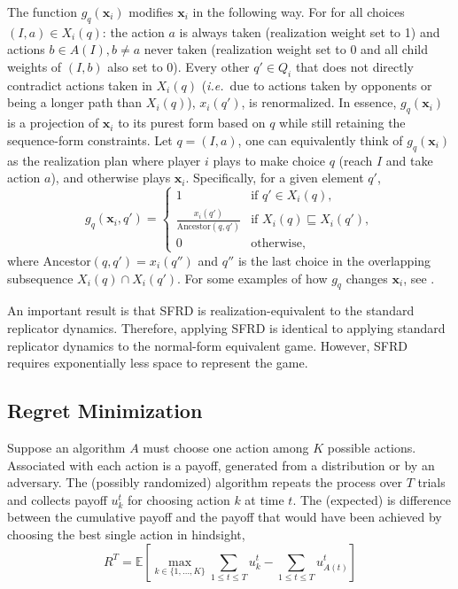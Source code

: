 \documentclass{aamas2014}
\newcommand{\bE}{\mathbb{E}}
\newcommand{\bx}{\mathbf{x}}
\newcommand{\defword}[1]{\textbf{\boldmath{#1}}}
\newcommand{\ie}{{\it i.e.}~}
\begin{document}
The function $g_q(\bx_i)$ modifies $\bx_i$ in the following way. 
For for all choices $(I,a) \in X_i(q)$: the action $a$ is always taken (realization weight
set to 1) and actions $b \in A(I), b \not= a$ never taken (realization weight set to 0 and all child weights of $(I,b)$ also set to 0). 
Every other $q' \in Q_i$ that does not directly contradict actions taken in $X_i(q)$ 
(\ie due to actions taken by opponents or being a longer path than $X_i(q)$),
$x_i(q')$, is renormalized. 
In essence, $g_q(\bx_i)$ is a projection of $\bx_i$ to its purest form based on $q$ 
while still retaining the sequence-form constraints. 
Let $q = (I,a)$, one can equivalently think of $g_q(\bx_i)$ as the realization plan where player $i$ plays to make choice $q$ 
(reach $I$ and take action $a$), and otherwise plays $\bx_i$. 
Specifically, for a given element $q'$, 
\begin{equation}
\label{eq:gdef}
g_q(\bx_i, q') = \left\{ \begin{array}{ll}
  1                                                   & \mbox{if $q' \in X_i(q)$}, \\
\frac{x_i(q')}{\mbox{Ancestor}(q, q')}    & \mbox{if $X_i(q) \sqsubseteq X_i(q')$}, \\  
  0                                                   & \mbox{otherwise}, \end{array} \right.
\end{equation}
where Ancestor$(q, q') = x_i(q'')$ and $q''$ is the last choice in the overlapping subsequence  
$X_i(q) \cap X_i(q')$. For some examples of how $g_q$ changes $\bx_i$, see \cite{Gatti13Efficient}. 

An important result is that SFRD is realization-equivalent to the standard replicator dynamics. Therefore, applying SFRD is identical 
to applying standard replicator dynamics to the normal-form equivalent game. However, SFRD requires exponentially less space to represent
the game. 

\subsection{Regret Minimization}
\label{sec:regmin}

Suppose an algorithm $A$ must choose one action among $K$ possible actions. 
Associated with each action is a payoff, generated from a distribution or by an adversary. 
The (possibly randomized) algorithm repeats the process over $T$ trials and collects payoff $u_k^t$ for choosing 
action $k$ at time $t$. 
The (expected) \defword{regret} is difference between the cumulative payoff and the payoff that would 
have been achieved by choosing the best single action in hindsight, 
\begin{equation}
\label{eq:regret}
R^T = \bE \left[ \max_{k \in \{1, \ldots, K\}} \sum_{1 \le t \le T} u_k^t - \sum_{1 \le t \le T} u_{A(t)}^t \right]
\end{equation}
\end{document}

